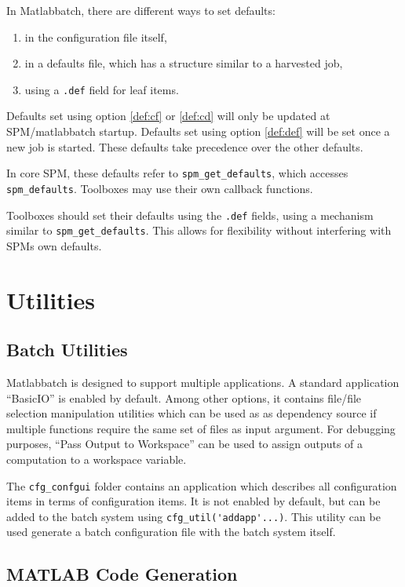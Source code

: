 In Matlabbatch, there are different ways to set defaults:
\begin{enumerate}
\item \label{def:cf}in the configuration file itself,
\item \label{def:cd}in a defaults file, which has a structure similar to a harvested
  job,
\item \label{def:def}using a \verb|.def| field for leaf items.
\end{enumerate}
Defaults set using option \ref{def:cf} or \ref{def:cd} will only be
updated at SPM/matlabbatch startup. Defaults set using option
\ref{def:def} will be set once a new job is started. These defaults take
precedence over the other defaults.

In core SPM, these defaults refer to \verb|spm_get_defaults|, which accesses
\verb|spm_defaults|. Toolboxes may use their own callback functions.

Toolboxes should set their defaults using the \verb|.def| fields,
using a mechanism similar to \verb|spm_get_defaults|. This allows for
flexibility without interfering with SPMs own defaults.

\section{Utilities}

\subsection{Batch Utilities}

Matlabbatch is designed to support multiple applications. A standard
application ``BasicIO'' is enabled by default. Among other options, it
contains file/file selection manipulation utilities which can be used as as
dependency source if multiple functions require the same set of files as input
argument. For debugging purposes, ``Pass Output to Workspace'' can be used to
assign outputs of a computation to a workspace variable.

The \verb|cfg_confgui| folder contains an application which describes all
configuration items in terms of configuration items. It is not enabled by
default, but can be added to the batch system using
\verb|cfg_util('addapp'...)|. This utility can be used generate a batch
configuration file with the batch system itself.

\subsection{MATLAB Code Generation}

